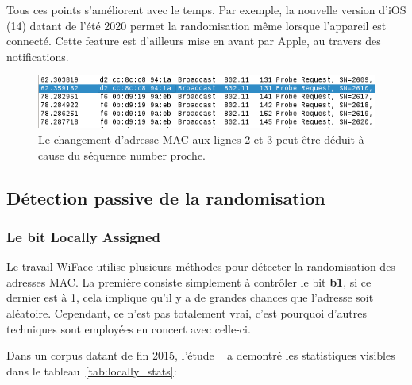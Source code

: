Tous ces points s'améliorent avec le temps. 
Par exemple, la nouvelle version d'iOS (14) datant de l'été 2020 permet la randomisation même lorsque l'appareil est connecté.
Cette feature est d'ailleurs mise en avant par Apple, au travers des notifications. \cite{APPLESUPPPRIVATE} 

\begin{figure}[H]
	\centering
	\includegraphics[width=12cm]{images/probe/sn.png}
	\caption{Le changement d'adresse MAC aux lignes 2 et 3 peut être déduit à cause du séquence number proche.}
	\label{fig:seqnumber}
\end{figure}

\subsection{Détection passive de la randomisation}

\subsubsection{Le bit Locally Assigned}
Le travail WiFace utilise plusieurs méthodes pour détecter la randomisation des adresses MAC. 
La première consiste simplement à contrôler le bit \textbf{b1}, si ce dernier est à 1, cela implique qu'il
y a de grandes chances que l'adresse soit aléatoire. Cependant, ce n'est pas totalement vrai, c'est pourquoi
d'autres techniques sont employées en concert avec celle-ci. 

Dans un corpus datant de fin 2015, l'étude ~\cite{ASMARMD} a demontré les statistiques visibles dans le tableau~\ref{tab:locally_stats}: 

\begin{table}[H]
	\caption{Statistiques sur la randomisation - Locally Assigned bit}
	\label{tab:locally_stats}
	\end{table}


